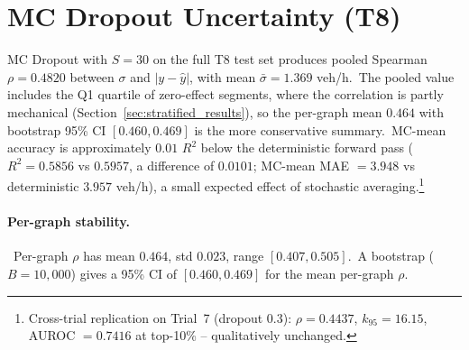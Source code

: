 \begin{table}[htbp]
\centering
\caption[Compact comparison: T1, T8, Deep Ensemble]{Compact comparison of T1, T8 and the Deep Ensemble.\ T1 has the highest absolute $R^2$ but is not MC-Dropout-compatible; T8 is the primary UQ base; the Deep Ensemble has the highest $R^2$ among the UQ-compatible models.\ T1 was evaluated on a separate 50-graph test set under an 80/15/5 split, whereas T8 and the Deep Ensemble share a different 100-graph test set under the 80/10/10 split (not a subsampled version of the same set), so the two test sets are independent and the cross-group comparison should be read descriptively.}
\label{tab:t1_t8_de_compact}
\end{table}

\section{MC Dropout Uncertainty (T8)}\label{sec:mc_results}

MC Dropout with $S = 30$ on the full T8 test set produces pooled Spearman $\rho = 0.4820$ between $\sigma$ and $|y - \hat y|$, with mean $\bar\sigma = 1.369$ veh/h.\ The pooled value includes the Q1 quartile of zero-effect segments, where the correlation is partly mechanical (Section~\ref{sec:stratified_results}), so the per-graph mean $0.464$ with bootstrap 95\% CI $[0.460, 0.469]$ is the more conservative summary.\ MC-mean accuracy is approximately $0.01$ $R^2$ below the deterministic forward pass ($R^2 = 0.5856$ vs $0.5957$, a difference of $0.0101$; MC-mean MAE $= 3.948$ vs deterministic $3.957$ veh/h), a small expected effect of stochastic averaging.\footnote{Cross-trial replication on Trial~7 (dropout 0.3): $\rho = 0.4437$, $k_{95} = 16.15$, AUROC $= 0.7416$ at top-10\% -- qualitatively unchanged.}

\paragraph{Per-graph stability.}\ Per-graph $\rho$ has mean $0.464$, std $0.023$, range $[0.407, 0.505]$.\ A bootstrap ($B = 10{,}000$) gives a 95\% CI of $[0.460, 0.469]$ for the mean per-graph $\rho$.

